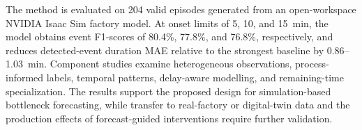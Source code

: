 \documentclass[12pt,a4paper,oneside]{report}
\begin{document}
The method is evaluated on 204 valid episodes generated from an open-workspace NVIDIA Isaac Sim factory model. At onset limits of 5, 10, and 15~min, the model obtains event F1-scores of 80.4\%, 77.8\%, and 76.8\%, respectively, and reduces detected-event duration MAE relative to the strongest baseline by 0.86--1.03~min. Component studies examine heterogeneous observations, process-informed labels, temporal patterns, delay-aware modelling, and remaining-time specialization. The results support the proposed design for simulation-based bottleneck forecasting, while transfer to real-factory or digital-twin data and the production effects of forecast-guided interventions require further validation.










\end{document}
